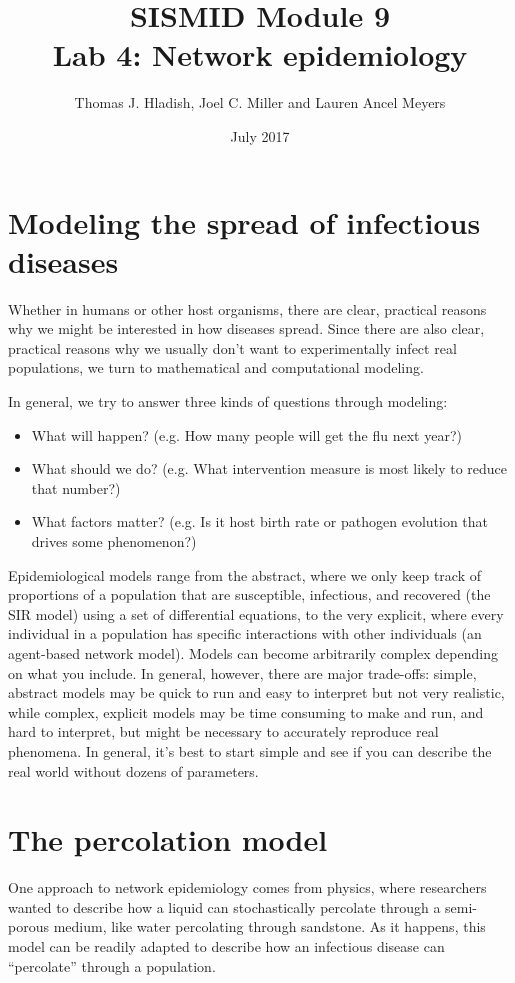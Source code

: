 \documentclass{article}
\begin{document}
\title{SISMID Module 9\\Lab 4: Network epidemiology}
\author{Thomas J. Hladish, Joel C. Miller and Lauren Ancel Meyers}
\date{July 2017}
\maketitle


\section*{Modeling the spread of infectious diseases}
Whether in humans or other host organisms, there are clear, practical reasons
why we might be interested in how diseases spread.  Since there are also clear,
practical reasons why we usually don't want to experimentally infect real
populations, we turn to mathematical and computational modeling.

In general, we try to answer three kinds of questions through modeling:
\begin{itemize}
 \item What will happen? (e.g. How many people will get the flu next year?)
 \item What should we do? (e.g. What intervention measure is most likely to
reduce that number?)
 \item What factors matter? (e.g. Is it host birth rate or pathogen evolution
that drives some phenomenon?)
\end{itemize}

Epidemiological models range from the abstract, where we only keep track of
proportions of a population that are susceptible, infectious, and recovered (the
SIR model) using a set of differential equations, to the very explicit, where
every individual in a population has specific interactions with other
individuals (an agent-based network model).  Models can become arbitrarily
complex depending on what you include.  In general, however, there are major
trade-offs: simple, abstract models may be quick to run and easy to interpret but
not very realistic, while complex, explicit models may be time consuming to make
and run, and hard to interpret, but might be necessary to accurately reproduce
real phenomena.  In general, it's best to start simple and see if you can
describe the real world without dozens of parameters.

\section*{The percolation model}
\label{perc}
One approach to network epidemiology comes from physics, where researchers
wanted to describe how a liquid can stochastically percolate through a
semi-porous medium, like water percolating through sandstone.  As it happens,
this model can be readily adapted to describe how an infectious disease can
``percolate'' through a population.
\end{document}
